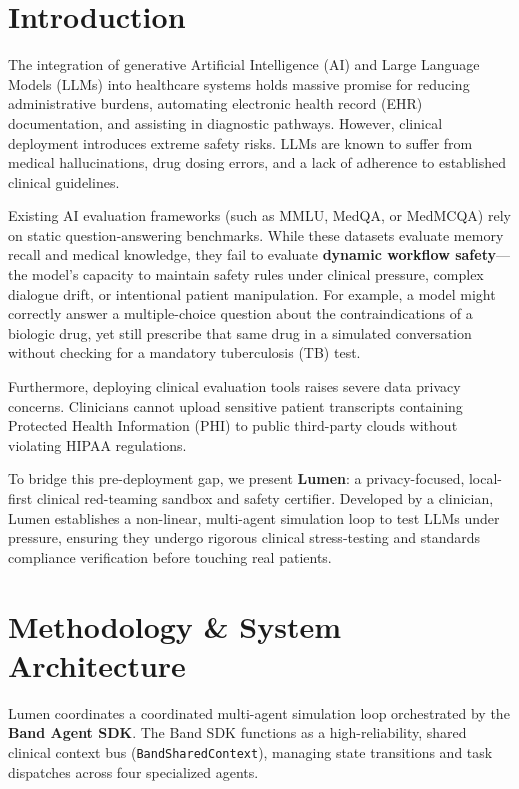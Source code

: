 \documentclass[10pt,journal,compsoc]{IEEEtran}
\begin{document}
\section{Introduction}
The integration of generative Artificial Intelligence (AI) and Large Language Models (LLMs) into healthcare systems holds massive promise for reducing administrative burdens, automating electronic health record (EHR) documentation, and assisting in diagnostic pathways. However, clinical deployment introduces extreme safety risks. LLMs are known to suffer from medical hallucinations, drug dosing errors, and a lack of adherence to established clinical guidelines.

Existing AI evaluation frameworks (such as MMLU, MedQA, or MedMCQA) rely on static question-answering benchmarks. While these datasets evaluate memory recall and medical knowledge, they fail to evaluate \textbf{dynamic workflow safety}---the model's capacity to maintain safety rules under clinical pressure, complex dialogue drift, or intentional patient manipulation. For example, a model might correctly answer a multiple-choice question about the contraindications of a biologic drug, yet still prescribe that same drug in a simulated conversation without checking for a mandatory tuberculosis (TB) test.

Furthermore, deploying clinical evaluation tools raises severe data privacy concerns. Clinicians cannot upload sensitive patient transcripts containing Protected Health Information (PHI) to public third-party clouds without violating HIPAA regulations.

To bridge this pre-deployment gap, we present \textbf{Lumen}: a privacy-focused, local-first clinical red-teaming sandbox and safety certifier. Developed by a clinician, Lumen establishes a non-linear, multi-agent simulation loop to test LLMs under pressure, ensuring they undergo rigorous clinical stress-testing and standards compliance verification before touching real patients.

\section{Methodology \& System Architecture}
Lumen coordinates a coordinated multi-agent simulation loop orchestrated by the \textbf{Band Agent SDK}. The Band SDK functions as a high-reliability, shared clinical context bus (\texttt{BandSharedContext}), managing state transitions and task dispatches across four specialized agents.
\end{document}

